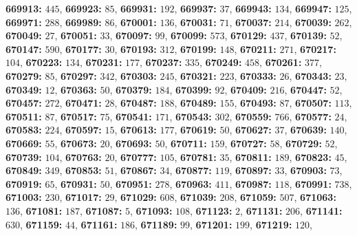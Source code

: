 \textsf{\bfseries 669913:} $445$, \textsf{\bfseries 669923:} $85$, \textsf{\bfseries 669931:} $192$, \textsf{\bfseries 669937:} $37$, \textsf{\bfseries 669943:} $134$, \textsf{\bfseries 669947:} $125$, \textsf{\bfseries 669971:} $288$, \textsf{\bfseries 669989:} $86$, \textsf{\bfseries 670001:} $136$, \textsf{\bfseries 670031:} $71$, \textsf{\bfseries 670037:} $214$, \textsf{\bfseries 670039:} $262$, \textsf{\bfseries 670049:} $27$, \textsf{\bfseries 670051:} $33$, \textsf{\bfseries 670097:} $99$, \textsf{\bfseries 670099:} $573$, \textsf{\bfseries 670129:} $437$, \textsf{\bfseries 670139:} $52$, \textsf{\bfseries 670147:} $590$, \textsf{\bfseries 670177:} $30$, \textsf{\bfseries 670193:} $312$, \textsf{\bfseries 670199:} $148$, \textsf{\bfseries 670211:} $271$, \textsf{\bfseries 670217:} $104$, \textsf{\bfseries 670223:} $134$, \textsf{\bfseries 670231:} $177$, \textsf{\bfseries 670237:} $335$, \textsf{\bfseries 670249:} $458$, \textsf{\bfseries 670261:} $377$, \textsf{\bfseries 670279:} $85$, \textsf{\bfseries 670297:} $342$, \textsf{\bfseries 670303:} $245$, \textsf{\bfseries 670321:} $223$, \textsf{\bfseries 670333:} $26$, \textsf{\bfseries 670343:} $23$, \textsf{\bfseries 670349:} $12$, \textsf{\bfseries 670363:} $50$, \textsf{\bfseries 670379:} $184$, \textsf{\bfseries 670399:} $92$, \textsf{\bfseries 670409:} $216$, \textsf{\bfseries 670447:} $52$, \textsf{\bfseries 670457:} $272$, \textsf{\bfseries 670471:} $28$, \textsf{\bfseries 670487:} $188$, \textsf{\bfseries 670489:} $155$, \textsf{\bfseries 670493:} $87$, \textsf{\bfseries 670507:} $113$, \textsf{\bfseries 670511:} $87$, \textsf{\bfseries 670517:} $75$, \textsf{\bfseries 670541:} $171$, \textsf{\bfseries 670543:} $302$, \textsf{\bfseries 670559:} $766$, \textsf{\bfseries 670577:} $24$, \textsf{\bfseries 670583:} $224$, \textsf{\bfseries 670597:} $15$, \textsf{\bfseries 670613:} $177$, \textsf{\bfseries 670619:} $50$, \textsf{\bfseries 670627:} $37$, \textsf{\bfseries 670639:} $140$, \textsf{\bfseries 670669:} $55$, \textsf{\bfseries 670673:} $20$, \textsf{\bfseries 670693:} $50$, \textsf{\bfseries 670711:} $159$, \textsf{\bfseries 670727:} $58$, \textsf{\bfseries 670729:} $52$, \textsf{\bfseries 670739:} $104$, \textsf{\bfseries 670763:} $20$, \textsf{\bfseries 670777:} $105$, \textsf{\bfseries 670781:} $35$, \textsf{\bfseries 670811:} $189$, \textsf{\bfseries 670823:} $45$, \textsf{\bfseries 670849:} $349$, \textsf{\bfseries 670853:} $51$, \textsf{\bfseries 670867:} $34$, \textsf{\bfseries 670877:} $119$, \textsf{\bfseries 670897:} $33$, \textsf{\bfseries 670903:} $73$, \textsf{\bfseries 670919:} $65$, \textsf{\bfseries 670931:} $50$, \textsf{\bfseries 670951:} $278$, \textsf{\bfseries 670963:} $411$, \textsf{\bfseries 670987:} $118$, \textsf{\bfseries 670991:} $738$, \textsf{\bfseries 671003:} $230$, \textsf{\bfseries 671017:} $29$, \textsf{\bfseries 671029:} $608$, \textsf{\bfseries 671039:} $208$, \textsf{\bfseries 671059:} $507$, \textsf{\bfseries 671063:} $136$, \textsf{\bfseries 671081:} $187$, \textsf{\bfseries 671087:} $5$, \textsf{\bfseries 671093:} $108$, \textsf{\bfseries 671123:} $2$, \textsf{\bfseries 671131:} $206$, \textsf{\bfseries 671141:} $630$, \textsf{\bfseries 671159:} $44$, \textsf{\bfseries 671161:} $186$, \textsf{\bfseries 671189:} $99$, \textsf{\bfseries 671201:} $199$, \textsf{\bfseries 671219:} $120$, 
